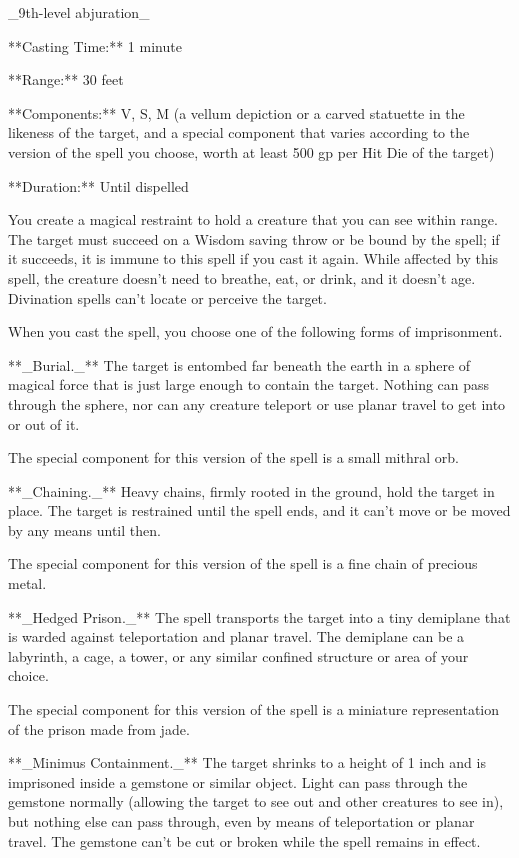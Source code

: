 _9th-level abjuration_

**Casting Time:** 1 minute

**Range:** 30 feet

**Components:** V, S, M (a vellum depiction or a carved statuette in the likeness of the target, and a special component that varies according to the version of the spell you choose, worth at least 500 gp per Hit Die of the target)

**Duration:** Until dispelled

You create a magical restraint to hold a creature that you can see within range. The target must succeed on a Wisdom saving throw or be bound by the spell; if it succeeds, it is immune to this spell if you cast it again. While affected by this spell, the creature doesn’t need to breathe, eat, or drink, and it doesn’t age. Divination spells can’t locate or perceive the target.

When you cast the spell, you choose one of the following forms of imprisonment.

**_Burial._** The target is entombed far beneath the earth in a sphere of magical force that is just large enough to contain the target. Nothing can pass through the sphere, nor can any creature teleport or use planar travel to get into or out of it.

The special component for this version of the spell is a small mithral orb.

**_Chaining._** Heavy chains, firmly rooted in the ground, hold the target in place. The target is restrained until the spell ends, and it can’t move or be moved by any means until then.

The special component for this version of the spell is a fine chain of precious metal.

**_Hedged Prison._** The spell transports the target into a tiny demiplane that is warded against teleportation and planar travel. The demiplane can be a labyrinth, a cage, a tower, or any similar confined structure or area of your choice.

The special component for this version of the spell is a miniature representation of the prison made from jade.

**_Minimus Containment._** The target shrinks to a height of 1 inch and is imprisoned inside a gemstone or similar object. Light can pass through the gemstone normally (allowing the target to see out and other creatures to see in), but nothing else can pass through, even by means of teleportation or planar travel. The gemstone can’t be cut or broken while the spell remains in effect.

